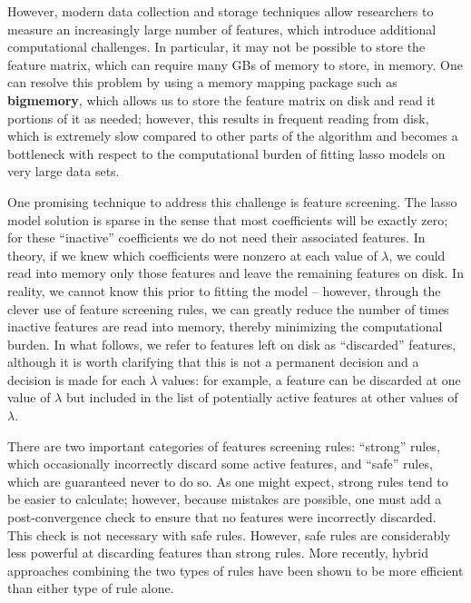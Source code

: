 \documentclass{article}
\begin{document}
However, modern data collection and storage techniques allow researchers to measure an increasingly large number of features, which introduce additional computational challenges. In particular, it may not be possible to store the feature matrix, which can require many GBs of memory to store, in memory. One can resolve this problem by using a memory mapping package such as \textbf{bigmemory}, which allows us to store the feature matrix on disk and read it portions of it as needed; however, this results in frequent reading from disk, which is extremely slow compared to other parts of the algorithm and becomes a bottleneck with respect to the computational burden of fitting lasso models on very large data sets.

One promising technique to address this challenge is feature screening. The lasso model solution is sparse in the sense that most coefficients will be exactly zero; for these ``inactive'' coefficients we do not need their associated features.  In theory, if we knew which coefficients were nonzero at each value of $\lambda$, we could read into memory only those features and leave the remaining features on disk. In reality, we cannot know this prior to fitting the model -- however, through the clever use of feature screening rules, we can greatly reduce the number of times inactive features are read into memory, thereby minimizing the computational burden.  In what follows, we refer to features left on disk as ``discarded'' features, although it is worth clarifying that this is not a permanent decision and a decision is made for each $\lambda$ values: for example, a feature can be discarded at one value of $\lambda$ but included in the list of potentially active features at other values of $\lambda$.

There are two important categories of features screening rules: ``strong'' rules\cite{tibshirani2011regression}\cite{qian2019fast}, which occasionally incorrectly discard some active features, and ``safe'' rules\cite{ghaoui2010safe,wang2013lasso,xiang2012fast, xiang2011learning}, which are guaranteed never to do so.  As one might expect, strong rules tend to be easier to calculate; however, because mistakes are possible, one must add a post-convergence check to ensure that no features were incorrectly discarded. This check is not necessary with safe rules. However, safe rules are considerably less powerful at discarding features than strong rules. More recently, hybrid approaches \cite{zeng2017efficient} combining the two types of rules have been shown to be more efficient than either type of rule alone.
\end{document}
